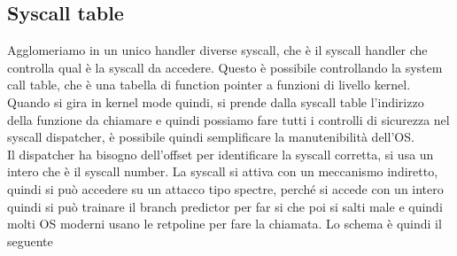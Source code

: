 \documentclass[12pt, oneside]{extbook} %
\begin{document}
\subsection{Syscall table}
Agglomeriamo in un unico handler diverse syscall, che è il syscall handler che controlla qual è la syscall da accedere. Questo è possibile controllando la system call table, che è una tabella di function pointer a funzioni di livello kernel.\\Quando si gira in kernel mode quindi, si prende dalla syscall table l'indirizzo della funzione da chiamare e quindi possiamo fare tutti i controlli di sicurezza nel syscall dispatcher, è possibile quindi semplificare la manutenibilità dell'OS.\\Il dispatcher ha bisogno dell'offset per identificare la syscall corretta, si usa un intero che è il syscall number. La syscall si attiva con un meccanismo indiretto, quindi si può accedere su un attacco tipo spectre, perché si accede con un intero quindi si può trainare il branch predictor per far si che poi si salti male e quindi molti OS moderni usano le retpoline per fare la chiamata. Lo schema è quindi il seguente
\end{document}
